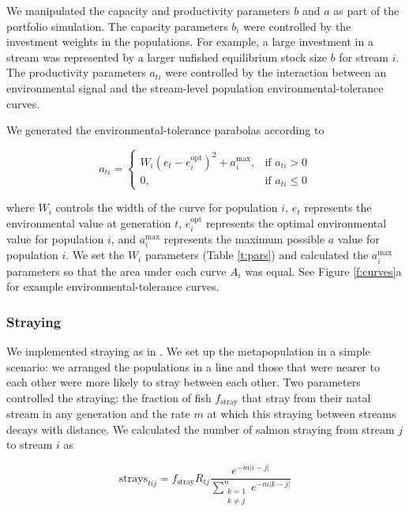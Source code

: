 We manipulated the capacity and productivity parameters $b$ and $a$ as part of the portfolio simulation. The capacity parameters $b_i$ were controlled by the investment weights in the populations. For example, a large investment in a stream was represented by a larger unfished equilibrium stock size $b$ for stream $i$. The productivity parameters $a_{ti}$ were controlled by the interaction between an environmental signal and the stream-level population environmental-tolerance curves.

We generated the environmental-tolerance parabolas according to

\begin{equation}
  a_{ti} =
  \begin{cases}
    W_i (e_t - e_i^{\mathrm{opt}})^2 + a_i^{\mathrm{max}},
      & \text{if } a_{ti} > 0\\
      0, & \text{if } a_{ti} \leq 0
  \end{cases}
\end{equation}

\noindent where $W_i$ controls the width of the curve for population $i$, $e_t$ represents the environmental value at generation $t$, $e_i^{\mathrm{opt}}$ represents the optimal environmental value for population $i$, and $a_i^{\mathrm{max}}$ represents the maximum possible $a$ value for population $i$. We set the $W_i$ parameters (Table \ref{t:pars}) and calculated the $a_i^{\mathrm{max}}$ parameters so that the area under each curve $A_i$ was equal. See Figure \ref{f:curves}a for example environmental-tolerance curves.

\subsubsection{Straying}

We implemented straying as in \citet{cooper1999}. We set up the metapopulation in a simple scenario: we arranged the populations in a line and those that were nearer to each other were more likely to stray between each other. Two parameters controlled the straying: the fraction of fish $f_{\mathrm{stray}}$ that stray from their natal stream in any generation and the rate $m$ at which this straying between streams decays with distance. We calculated the number of salmon straying from stream $j$ to stream $i$ as

\begin{equation}
  \mathrm{strays}_{tij} = f_{\mathrm{stray}} R_{tj}
    \frac{e^{-m \lvert i-j \rvert }}
      {\displaystyle\sum\limits_{\substack{k = 1 \\
    k \neq j}}^{n} e^{-m \lvert k-j \rvert }}
  \label{eq:stray}
\end{equation}


